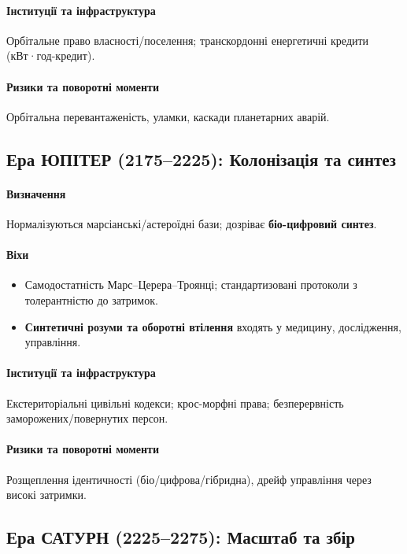 \documentclass[11pt]{article}
\begin{document}
\paragraph{Інституції та інфраструктура} Орбітальне право власності/поселення; транскордонні енергетичні кредити (кВт·год-кредит).

\paragraph{Ризики та поворотні моменти} Орбітальна перевантаженість, уламки, каскади планетарних аварій.

\subsection{Ера ЮПІТЕР (2175–2225): Колонізація та синтез}
\paragraph{Визначення} Нормалізуються марсіанські/астероїдні бази; дозріває \textbf{біо-цифровий синтез}.

\paragraph{Віхи}
\begin{itemize}[noitemsep]
  \item Самодостатність Марс–Церера–Троянці; стандартизовані протоколи з толерантністю до затримок.
  \item \textbf{Синтетичні розуми та оборотні втілення} входять у медицину, дослідження, управління.
\end{itemize}

\paragraph{Інституції та інфраструктура} Екстериторіальні цивільні кодекси; крос-морфні права; безперервність заморожених/повернутих персон.

\paragraph{Ризики та поворотні моменти} Розщеплення ідентичності (біо/цифрова/гібридна), дрейф управління через високі затримки.

\subsection{Ера САТУРН (2225–2275): Масштаб та збір}
\end{document}
